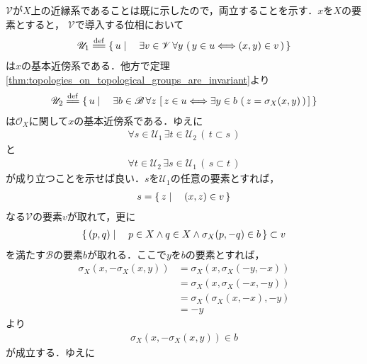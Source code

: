 	\begin{sketch}
		$\mathscr{V}$が$X$上の近縁系であることは既に示したので，両立することを示す．$x$を$X$の要素とすると，
		$\mathscr{V}$で導入する位相において
		\begin{align}
			\mathscr{U}_1 \defeq
			\Set{u}{\exists v \in \mathscr{V}\, \forall y\, \left(\, y \in u \Longleftrightarrow (x,y) \in v\, \right)}
		\end{align}
		は$x$の基本近傍系である．他方で定理\ref{thm:topologies_on_topological_groups_are_invariant}より
		\begin{align}
			\mathscr{U}_2 \defeq
			\Set{u}{\exists b \in \mathscr{B}\, 
			\forall z\, \left[\, z \in u \Longleftrightarrow \exists y \in b\, \left(\, z=\sigma_X(x,y)\, \right) \, \right]}
		\end{align}
		は$\mathscr{O}_X$に関して$x$の基本近傍系である．ゆえに
		\begin{align}
			\forall s \in \mathscr{U}_1\, \exists t \in \mathscr{U}_2\, (\, t \subset s\, )
			\label{fom:thm_topological_groups_are_uniformazable_1}
		\end{align}
		と
		\begin{align}
			\forall t \in \mathscr{U}_2\, \exists s \in \mathscr{U}_1\, (\, s \subset t\, )
			\label{fom:thm_topological_groups_are_uniformazable_2}
		\end{align}
		が成り立つことを示せば良い．$s$を$\mathscr{U}_1$の任意の要素とすれば，
		\begin{align}
			s = \left\{\, z \mid \quad (x,z) \in v\, \right\}
		\end{align}
		なる$\mathscr{V}$の要素$v$が取れて，更に
		\begin{align}
			\left\{\, (p,q) \mid \quad p \in X \wedge q \in X \wedge \sigma_X(p,-q) \in b\, \right\} \subset v
		\end{align}
		を満たす$\mathscr{B}$の要素$b$が取れる．ここで$y$を$b$の要素とすれば，
		\begin{align}
			\sigma_X\left(x,-\sigma_X\left(x,y\right)\right)
			&= \sigma_X\left(x,\sigma_X\left(-y,-x\right)\right) \\
			&= \sigma_X\left(x,\sigma_X\left(-x,-y\right)\right) \\
			&= \sigma_X\left(\sigma_X\left(x,-x\right),-y\right) \\
			&= -y
		\end{align}
		より
		\begin{align}
			\sigma_X\left(x,-\sigma_X\left(x,y\right)\right) \in b
		\end{align}
		が成立する．ゆえに
		\begin{align}

\end{align}
\end{sketch}

